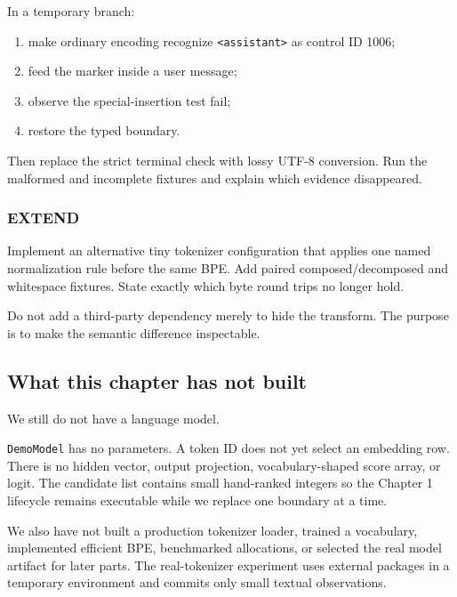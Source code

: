 \documentclass[
  10pt,
]{article}
\providecommand{\tightlist}{%
  \setlength{\itemsep}{0pt}\setlength{\parskip}{0pt}}
\begin{document}
In a temporary branch:

\begin{enumerate}
\def\labelenumi{\arabic{enumi}.}
\tightlist
\item
  make ordinary encoding recognize
  \texttt{\textless{}\textbar{}assistant\textbar{}\textgreater{}} as
  control ID 1006;
\item
  feed the marker inside a user message;
\item
  observe the special-insertion test fail;
\item
  restore the typed boundary.
\end{enumerate}

Then replace the strict terminal check with lossy UTF-8 conversion. Run
the malformed and incomplete fixtures and explain which evidence
disappeared.

\subsubsection{EXTEND}\label{extend-1}

Implement an alternative tiny tokenizer configuration that applies one
named normalization rule before the same BPE. Add paired
composed/decomposed and whitespace fixtures. State exactly which byte
round trips no longer hold.

Do not add a third-party dependency merely to hide the transform. The
purpose is to make the semantic difference inspectable.

\subsection{What this chapter has not
built}\label{what-this-chapter-has-not-built}

We still do not have a language model.

\texttt{DemoModel} has no parameters. A token ID does not yet select an
embedding row. There is no hidden vector, output projection,
vocabulary-shaped score array, or logit. The candidate list contains
small hand-ranked integers so the Chapter 1 lifecycle remains executable
while we replace one boundary at a time.

We also have not built a production tokenizer loader, trained a
vocabulary, implemented efficient BPE, benchmarked allocations, or
selected the real model artifact for later parts. The real-tokenizer
experiment uses external packages in a temporary environment and commits
only small textual observations.
\end{document}
